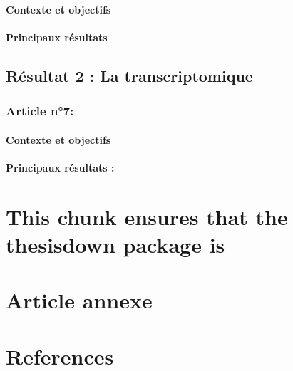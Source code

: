 \documentclass[12pt,a4paper,twoside]{ugathesis}
\begin{document}
\subsubsection{Contexte et objectifs}\label{contexte-et-objectifs-5}

\subsubsection{Principaux résultats}\label{principaux-resultats-5}

\section{Résultat 2 : La transcriptomique}\label{transcriptome}

\subsection{Article n°7:}\label{article-n7}

\subsubsection{Contexte et objectifs}\label{contexte-et-objectifs-6}

\subsubsection{Principaux résultats :}\label{principaux-resultats-6}

\chapter{This chunk ensures that the thesisdown package
is}\label{this-chunk-ensures-that-the-thesisdown-package-is}

\chapter{Article annexe}\label{dnah12014}

\chapter*{References}\label{references}


\end{document}
